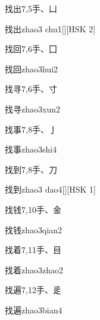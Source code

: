 \begin{entry}{找出}{7,5}{⼿、⼐}
  \begin{phonetics}{找出}{zhao3 chu1}[][HSK 2]
  \end{phonetics}
\end{entry}

\begin{entry}{找回}{7,6}{⼿、⼞}
  \begin{phonetics}{找回}{zhao3hui2}
  \end{phonetics}
\end{entry}

\begin{entry}{找寻}{7,6}{⼿、⼨}
  \begin{phonetics}{找寻}{zhao3xun2}
  \end{phonetics}
\end{entry}

\begin{entry}{找事}{7,8}{⼿、⼅}
  \begin{phonetics}{找事}{zhao3shi4}
  \end{phonetics}
\end{entry}

\begin{entry}{找到}{7,8}{⼿、⼑}
  \begin{phonetics}{找到}{zhao3 dao4}[][HSK 1]
  \end{phonetics}
\end{entry}

\begin{entry}{找钱}{7,10}{⼿、⾦}
  \begin{phonetics}{找钱}{zhao3qian2}
  \end{phonetics}
\end{entry}

\begin{entry}{找着}{7,11}{⼿、⽬}
  \begin{phonetics}{找着}{zhao3zhao2}
  \end{phonetics}
\end{entry}

\begin{entry}{找遍}{7,12}{⼿、⾡}
  \begin{phonetics}{找遍}{zhao3bian4}
  \end{phonetics}
\end{entry}

